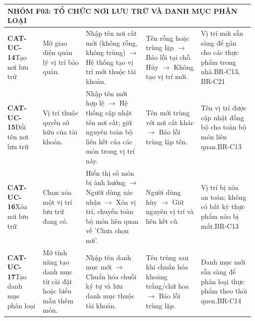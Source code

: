 \documentclass[10pt,a4paper]{article}
\begin{document}
\begin{longtable}{|p{2.1cm}|p{2.3cm}|p{3.5cm}|p{3.8cm}|p{3.0cm}|}
\multicolumn{5}{|l|}{\textbf{\color{primary}NHÓM F03: TỔ CHỨC NƠI LƯU TRỮ VÀ DANH MỤC PHÂN LOẠI}} \\
\hline
\textbf{CAT-UC-14}\newline Tạo nơi lưu trữ & Mở giao diện quản lý vị trí bảo quản. & Nhập tên nơi cất mới (không rỗng, không trùng) $\to$ Hệ thống tạo vị trí mới thuộc tài khoản. & Tên rỗng hoặc trùng lặp $\to$ Báo lỗi tại chỗ. Hủy $\to$ Không tạo vị trí mới. & Vị trí mới sẵn sàng để gán cho các thực phẩm trong nhà.\newline BR-C13, BR-C21 \\
\hline
\textbf{CAT-UC-15}\newline Đổi tên nơi lưu trữ & Vị trí thuộc quyền sở hữu của tài khoản. & Nhập tên mới hợp lệ $\to$ Hệ thống cập nhật tên nơi cất; giữ nguyên toàn bộ liên kết của các món trong vị trí này. & Tên mới trùng với nơi cất khác $\to$ Báo lỗi trùng lặp tên. & Tên vị trí được cập nhật đồng bộ cho toàn bộ món liên quan.\newline BR-C13 \\
\hline
\textbf{CAT-UC-16}\newline Xóa nơi lưu trữ & Chọn xóa một vị trí lưu trữ đang có. & Hiển thị số món bị ảnh hưởng $\to$ Người dùng xác nhận $\to$ Xóa vị trí, chuyển toàn bộ món liên quan về 'Chưa chọn nơi'. & Người dùng hủy $\to$ Giữ nguyên vị trí và liên kết cũ. & Vị trí bị xóa an toàn; không có bất kỳ thực phẩm nào bị mất.\newline BR-C13 \\
\hline
\textbf{CAT-UC-17}\newline Tạo danh mục phân loại & Mở tính năng tạo danh mục từ cài đặt hoặc biểu mẫu thêm món. & Nhập tên danh mục mới $\to$ Chuẩn hóa chuỗi ký tự và lưu danh mục thuộc tài khoản. & Tên trùng sau khi chuẩn hóa khoảng trắng/chữ hoa $\to$ Báo lỗi trùng lặp. & Danh mục mới sẵn sàng để phân loại thực phẩm theo thói quen.\newline BR-C14 \\
\hline


\end{longtable}
\end{document}
